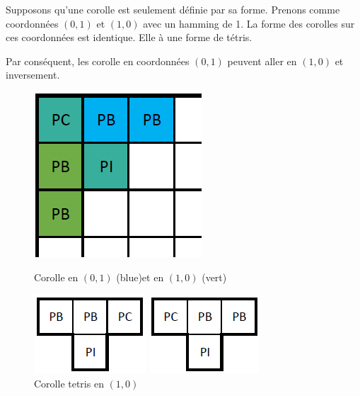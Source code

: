 	\begin{exmp}
		Supposons qu'une corolle est seulement définie par sa forme. Prenons comme coordonnées $(0,1)$ et $(1,0)$ avec un hamming de 1. La forme des corolles sur ces coordonnées est identique. Elle à une forme de tétris.
		
		Par conséquent, les corolle en coordonnées $(0,1)$ peuvent aller en $(1,0)$ et inversement.
		
		\begin{figure}[H]
			\begin{minipage}{0.33\textwidth}
				\includegraphics[width=\linewidth]{images/corolle_tetris_bord.png}
				\caption{Corolle en $(0,1)$ (blue)et en $(1,0)$ (vert)}\label{fig:corolle_tetris_bord}
			\end{minipage}\hfill
			\begin{minipage}{0.33\textwidth}
				\begin{center}
					\includegraphics{images/corolle_tetris_1.png}
					\caption{Corolle tetris en $(1,0)$}\label{fig:corolle_tetris_1}
					\includegraphics{images/corolle_tetris_2.png}

\end{center}
\end{minipage}
\end{figure}
\end{exmp}
